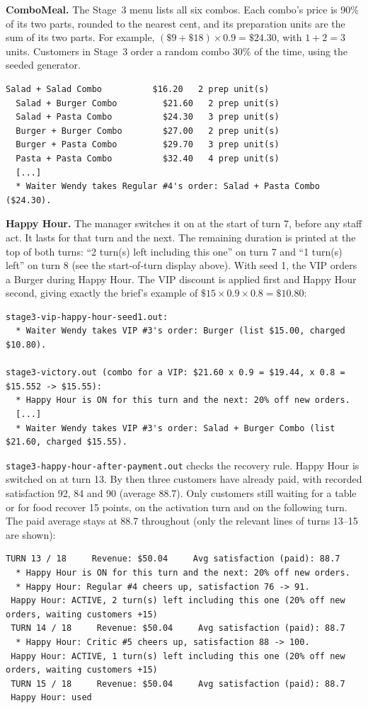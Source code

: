 \textbf{ComboMeal.} The Stage~3 menu lists all six combos. Each combo's price is 90\% of
its two parts, rounded to the nearest cent, and its preparation units are the sum of its
two parts. For example, $(\$9 + \$18) \times 0.9 = \$24.30$, with $1 + 2 = 3$ units.
Customers in Stage~3 order a random combo 30\% of the time, using the seeded generator.

\begin{lstlisting}[style=run]
  Salad + Salad Combo          $16.20   2 prep unit(s)
  Salad + Burger Combo         $21.60   2 prep unit(s)
  Salad + Pasta Combo          $24.30   3 prep unit(s)
  Burger + Burger Combo        $27.00   2 prep unit(s)
  Burger + Pasta Combo         $29.70   3 prep unit(s)
  Pasta + Pasta Combo          $32.40   4 prep unit(s)
  [...]
  * Waiter Wendy takes Regular #4's order: Salad + Pasta Combo ($24.30).
\end{lstlisting}

\textbf{Happy Hour.} The manager switches it on at the start of turn 7, before any staff
act. It lasts for that turn and the next. The remaining duration is printed at the top of
both turns: ``2 turn(s) left including this one'' on turn 7 and ``1 turn(s) left'' on
turn 8 (see the start-of-turn display above). With seed 1, the VIP orders a Burger during Happy Hour. The
VIP discount is applied first and Happy Hour second, giving exactly the brief's example of
$\$15 \times 0.9 \times 0.8 = \$10.80$:

\begin{lstlisting}[style=run]
stage3-vip-happy-hour-seed1.out:
  * Waiter Wendy takes VIP #3's order: Burger (list $15.00, charged $10.80).

stage3-victory.out (combo for a VIP: $21.60 x 0.9 = $19.44, x 0.8 = $15.552 -> $15.55):
  * Happy Hour is ON for this turn and the next: 20% off new orders.
  [...]
  * Waiter Wendy takes VIP #3's order: Salad + Burger Combo (list $21.60, charged $15.55).
\end{lstlisting}

\texttt{stage3-happy-hour-after-payment.out} checks the recovery rule. Happy Hour is
switched on at turn 13. By then three customers have already paid, with recorded
satisfaction 92, 84 and 90 (average 88.7). Only customers still waiting for a table or
for food recover 15 points, on the activation turn and on the following turn. The paid
average stays at 88.7 throughout (only the relevant lines of turns 13--15 are shown):

\begin{lstlisting}[style=run]
 TURN 13 / 18     Revenue: $50.04     Avg satisfaction (paid): 88.7
  * Happy Hour is ON for this turn and the next: 20% off new orders.
  * Happy Hour: Regular #4 cheers up, satisfaction 76 -> 91.
 Happy Hour: ACTIVE, 2 turn(s) left including this one (20% off new orders, waiting customers +15)
 TURN 14 / 18     Revenue: $50.04     Avg satisfaction (paid): 88.7
  * Happy Hour: Critic #5 cheers up, satisfaction 88 -> 100.
 Happy Hour: ACTIVE, 1 turn(s) left including this one (20% off new orders, waiting customers +15)
 TURN 15 / 18     Revenue: $50.04     Avg satisfaction (paid): 88.7
 Happy Hour: used
\end{lstlisting}


